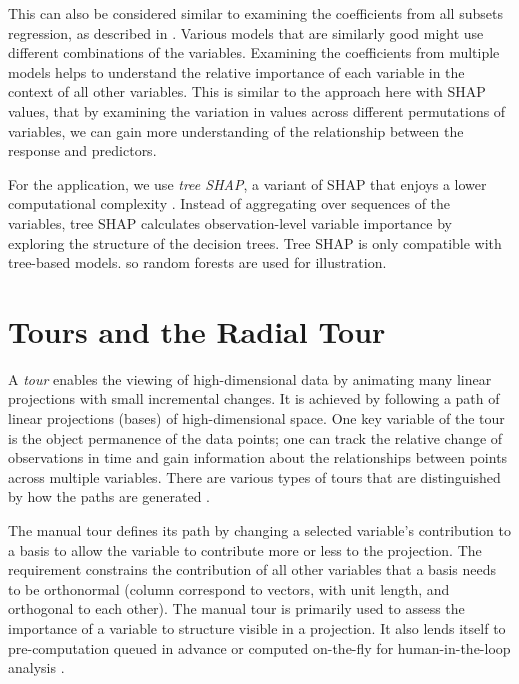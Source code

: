 \documentclass[
]{jss}
\begin{document}
This can also be considered similar to examining the coefficients from all subsets regression, as described in \citet{wickham_visualizing_2015}. Various models that are similarly good might use different combinations of the variables. Examining the coefficients from multiple models helps to understand the relative importance of each variable in the context of all other variables. This is similar to the approach here with SHAP values, that by examining the variation in values across different permutations of variables, we can gain more understanding of the relationship between the response and predictors.

For the application, we use \emph{tree SHAP}, a variant of SHAP that enjoys a lower computational complexity \citep{lundberg_consistent_2018}. Instead of aggregating over sequences of the variables, tree SHAP calculates observation-level variable importance by exploring the structure of the decision trees. Tree SHAP is only compatible with tree-based models. so random forests are used for illustration.

\hypertarget{sec:tour}{%
\section{Tours and the Radial Tour}\label{sec:tour}}

A \emph{tour} enables the viewing of high-dimensional data by animating many linear projections with small incremental changes. It is achieved by following a path of linear projections (bases) of high-dimensional space. One key variable of the tour is the object permanence of the data points; one can track the relative change of observations in time and gain information about the relationships between points across multiple variables. There are various types of tours that are distinguished by how the paths are generated \citep{lee_state_2021, cook_grand_2008}.

The manual tour \citep{cook_manual_1997} defines its path by changing a selected variable's contribution to a basis to allow the variable to contribute more or less to the projection. The requirement constrains the contribution of all other variables that a basis needs to be orthonormal (column correspond to vectors, with unit length, and orthogonal to each other). The manual tour is primarily used to assess the importance of a variable to structure visible in a projection. It also lends itself to pre-computation queued in advance or computed on-the-fly for human-in-the-loop analysis \citep{karwowski_international_2006}.
\end{document}
